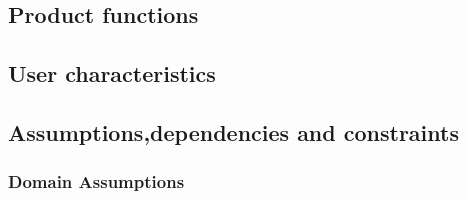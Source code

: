 \subsection{Product functions}



\subsection{User characteristics}



\subsection{Assumptions,dependencies and constraints}
\subsubsection{Domain Assumptions}

